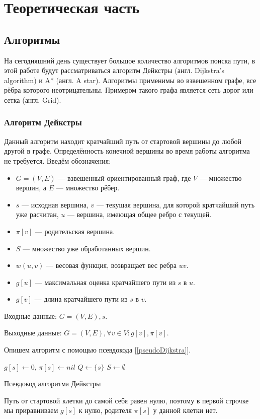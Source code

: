 \section{Теоретическая часть}
\subsection{Алгоритмы}
На сегодняшний день существует большое количество алгоритмов поиска пути, в этой работе будут рассматриваться алгоритм Дейкстры (англ. Dijkstra’s algorithm) и A* (англ. A star). Алгоритмы применимы во взвешенном графе, все рёбра которого неотрицательны. Примером такого графа является сеть дорог или сетка (англ. Grid). 
\subsubsection{Алгоритм Дейкстры}
Данный алгоритм находит кратчайший путь от стартовой вершины до любой другой в графе. Определённость конечной вершины во время работы алгоритма не требуется.
Введём обозначения:
\begin{itemize}
    \item $G = (V,E)$ — взвешенный ориентированный граф, где $V$ — множество вершин, а $E$ — множество рёбер.
    \item $s$ — исходная вершина, $v$ — текущая вершина, для которой кратчайший путь уже расчитан, $u$ — вершина, имеющая общее ребро с текущей.
    \item $\pi[v]$ — родительская вершина.
    \item $S$ — множество уже обработанных вершин.
    \item $w(u,v)$ — весовая функция, возвращает вес ребра $uv$.
    \item $g[u]$ — максимальная оценка кратчайшего пути из $s$ в $u$.
    \item $g[v]$ — длина кратчайшего пути из $s$ в $v$.

\end{itemize}

Входные данные: $G = (V,E), s$.

Выходные данные: $G = (V,E),  \forall v \in V: g[v],\pi[v]$.

Опишем алгоритм с помощью псевдокода [\ref{pseudoDijkstra}].

\begin{algorithm}

\DontPrintSemicolon
$g[s]\gets 0$, $\pi[s] \gets nil$\;
$Q \gets \{s\}$\;
$S \gets \emptyset$\;


\caption{Псевдокод алгоритма Дейкстры}
\label{pseudoDijkstra}
\end{algorithm}
Путь от стартовой клетки до самой себя равен нулю, поэтому в первой строчке мы приравниваем $g[s]$ к нулю, родителя $\pi[s]$ у данной клетки нет.

